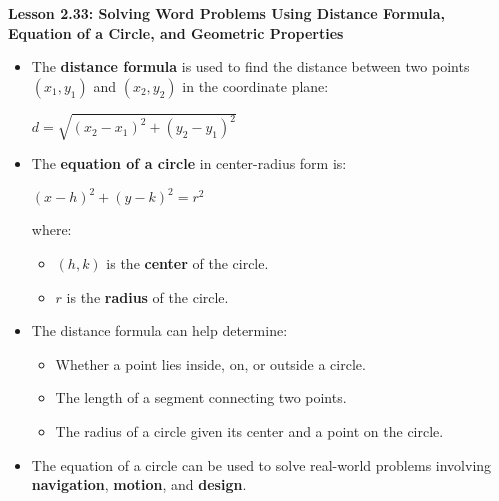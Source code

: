 \begin{center}
\textbf{Lesson 2.33: Solving Word Problems Using Distance Formula, Equation of a Circle, and Geometric Properties}
\end{center}

\vspace*{-1.5ex}

\begin{itemize}
    \item The \textbf{distance formula} is used to find the distance between two points $(x_1, y_1)$ and $(x_2, y_2)$ in the coordinate plane:

{\centering $
    d = \sqrt{(x_2 - x_1)^2 + (y_2 - y_1)^2}
$\par}
    \item The \textbf{equation of a circle} in center-radius form is:

{\centering $
    (x - h)^2 + (y - k)^2 = r^2
$\par}
    where:
    \begin{itemize}
        \item $(h, k)$ is the \textbf{center} of the circle.
        \item $r$ is the \textbf{radius} of the circle.
    \end{itemize}
    \item The distance formula can help determine:
    \begin{itemize}
        \item Whether a point lies inside, on, or outside a circle.
        \item The length of a segment connecting two points.
        \item The radius of a circle given its center and a point on the circle.
    \end{itemize}
    \item The equation of a circle can be used to solve real-world problems involving \textbf{navigation}, \textbf{motion}, and \textbf{design}.
\end{itemize}
